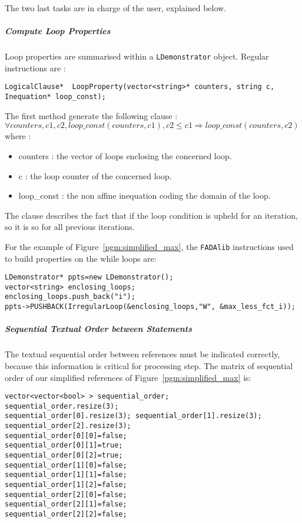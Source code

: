 The two last tasks are in charge of the user, explained below.

\subparagraph{Compute Loop Properties}
Loop properties are summarised within a \verb|LDemonstrator| object. Regular instructions are :
\begin{footnotesize}\begin{lstlisting}[frame=single,framerule=0pt]
LogicalClause*	LoopProperty(vector<string>* counters, string c, Inequation* loop_const);
\end{lstlisting}
\end{footnotesize}
The first method generate the following clause : \\
\begin{math}
 \forall counters, c1, c2, loop\_const(counters,c1), c2 \leq c1 \Rightarrow loop\_const(counters, c2)
\end{math}
where :
\begin{itemize}
 \item counters : the vector of loops enclosing the concerned loop.
 \item c : the loop counter of the concerned loop.
 \item loop\_const : the non affine inequation coding the domain of the loop.
\end{itemize}

The clause describes the fact that if the loop condition is upheld for an iteration, so it is so for all previous iterations.

For the example of Figure~\ref{pgm:simplified_max}, the \verb|FADAlib| instructions used to build properties on the while loops are:

\begin{footnotesize}\begin{lstlisting}[frame=single,framerule=0pt]
LDemonstrator* ppts=new LDemonstrator();
vector<string> enclosing_loops;
enclosing_loops.push_back("i");
ppts->PUSHBACK(IrregularLoop(&enclosing_loops,"W", &max_less_fct_i));
\end{lstlisting}
\end{footnotesize}
\subparagraph{Sequential Textual Order between Statements}
The textual sequential order between references must be indicated correctly, because this information is critical for processing step. The matrix of sequential order of our simplified references of Figure~\ref{pgm:simplified_max} is: 

\begin{footnotesize}\begin{lstlisting}[frame=single,framerule=0pt]
vector<vector<bool> > sequential_order;
sequential_order.resize(3);
sequential_order[0].resize(3); sequential_order[1].resize(3); sequential_order[2].resize(3);
sequential_order[0][0]=false;
sequential_order[0][1]=true;
sequential_order[0][2]=true;
sequential_order[1][0]=false;
sequential_order[1][1]=false;
sequential_order[1][2]=false;
sequential_order[2][0]=false;
sequential_order[2][1]=false;
sequential_order[2][2]=false;
\end{lstlisting}\end{footnotesize}

